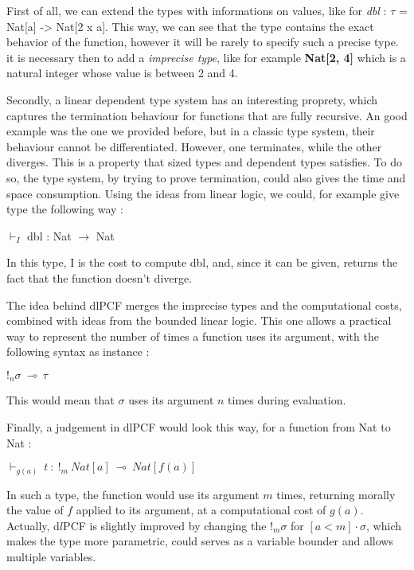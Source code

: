 \documentclass[a4paper,12pt]{report}
\begin{document}
First of all, we can extend the types with informations on values, like for
\emph{dbl} : $\tau$ = Nat[a] -> Nat[2 x a]. This way, we can see that the type
contains the exact behavior of the function, however it will be rarely to
specify such a precise type. it is necessary then to add a \emph{imprecise
  type}, like for example \textbf{Nat[2, 4]} which is a natural integer whose
value is between 2 and 4.

\medskip

Secondly, a linear dependent type system has an interesting proprety, which
captures the termination behaviour for functions that are fully recursive. An
good example was the one we provided before, but in a classic type system, their
behaviour cannot be differentiated. However, one terminates, while the other
diverges. This is a property that sized types and dependent types satisfies. To
do so, the type system, by trying to prove termination, could also gives the
time and space consumption. Using the ideas from linear logic, we could, for
example give type the following way :

\begin{center}
$\vdash_{I}$ dbl : Nat $\rightarrow$ Nat
\end{center}

In this type, I is the cost to compute dbl, and, since it can be given, returns
the fact that the function doesn't diverge.

The idea behind dlPCF merges the imprecise types and the computational costs,
combined with ideas from the bounded linear logic. This one allows a practical
way to represent the number of times a function uses its argument, with the
following syntax as instance :

\begin{center}
$!_{n}\sigma~\multimap~\tau$
\end{center} 

This would mean that $\sigma$ uses its argument $n$ times during evaluation. 

\medskip

Finally, a judgement in dlPCF would look this way, for a function from Nat to
Nat :

\begin{center}
$\vdash_{g(a)}~t~:~!_{m}~Nat[a]~\multimap~Nat[f(a)]$ 
\end{center}

In such a type, the function would use its argument $m$ times, returning morally
the value of $f$ applied to its argument, at a computational cost of
$g(a)$. Actually, d$l$PCF is slightly improved by changing the $!_{m}\sigma$ for
$[a < m] \cdot \sigma$, which makes the type more parametric, could serves as a
variable bounder and allows multiple variables.
\end{document}
